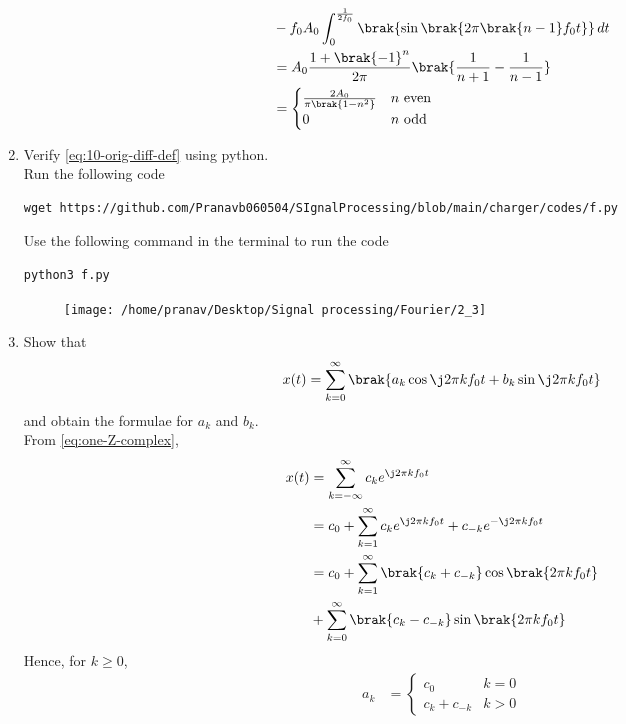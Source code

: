 \documentclass[journal,12pt,twocolumn]{IEEEtran}
\renewcommand\thesection{\arabic{section}}
\begin{document}
\begin{enumerate}[label=\thesection.\arabic*,ref=\thesection.\theenumi]
\begin{align}
        &- f_0A_0\int_{0}^{\frac{1}{2f_0}}\brak{\sin\brak{2\pi\brak{n-1}f_0t}}\, dt \\ 
        &= A_0\frac{1+\brak{-1}^n}{2\pi}\brak{\frac{1}{n+1} - \frac{1}{n-1}} \\
        &= 
        \begin{cases}
            \frac{2A_0}{\pi\brak{1-n^2}} & n\ \text{even} \\
            0 & n\ \text{odd}
        \end{cases}
\end{align}
\item Verify 
	\eqref{eq:10-orig-diff-def}
	using python.\\
	\solution
				Run the following code 
\begin{lstlisting}
wget https://github.com/Pranavb060504/SIgnalProcessing/blob/main/charger/codes/f.py
\end{lstlisting}
Use the following command in the terminal to run the code
\begin{lstlisting}
python3 f.py
\end{lstlisting}
		    \begin{figure}[!ht]
			\centering
			\texttt{[image: /home/pranav/Desktop/Signal processing/Fourier/2\_3]}
			\caption{}
			\label{fig:f1}
\end{figure}
	\item Show that 
\begin{align}
	x(t) = \sum_{k = 0}^{\infty}\brak{a_k\cos{\j2\pi kf_0 t}+b_k\sin{\j2\pi kf_0 t}}
\label{eq:one-Z-real}
\end{align}
and obtain the formulae for $a_k$ and $b_k$.\\
\solution From \eqref{eq:one-Z-complex},
\begin{align}
    x(t) &= \sum_{k = -\infty}^{\infty}c_ke^{\j2\pi kf_0 t} \\
         &= c_0 + \sum_{k = 1}^{\infty}c_ke^{\j2\pi kf_0t} + c_{-k}e^{-\j2\pi kf_0t} \\
         &= c_0 + \sum_{k = 1}^{\infty}\brak{c_k + c_{-k}}\cos\brak{2\pi kf_0t}  \nonumber \\
         &+ \sum_{k = 0}^{\infty}\brak{c_k - c_{-k}}\sin\brak{2\pi kf_0t}
\end{align}
Hence, for $k \ge 0$,
\begin{align}
    a_k &= 
    \begin{cases}
        c_0 & k = 0 \\
        c_k + c_{-k} & k > 0
    \end{cases} \\

\end{align}
\end{enumerate}
\end{document}
